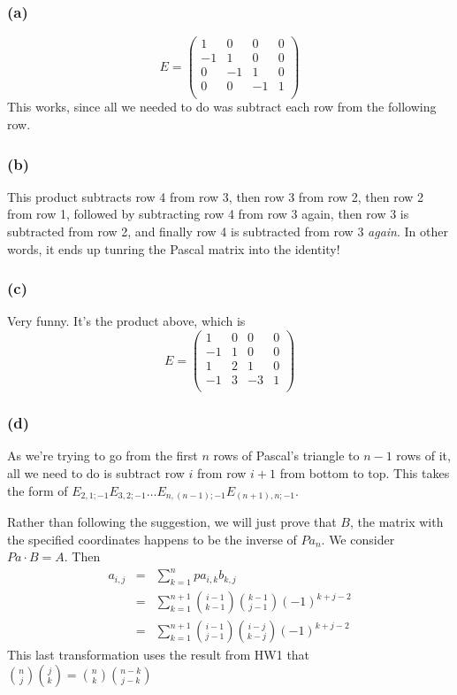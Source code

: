 \documentclass{article}
\begin{document}
\subsubsection{(a)}
\[
E=\left( 
\begin{array}{cccc}
1 &0 &0 &0\\
-1&1 &0 &0\\
0 &-1&1 &0\\
0 &0 &-1&1\\
\end{array}
\right)
\]
This works, since all we needed to do was subtract each row from the following
row.
\subsubsection{(b)}
This product subtracts row 4 from row 3, then row 3 from row 2, then row 2 from
row 1, followed by subtracting row 4 from row 3 again, then row 3 is subtracted
from row 2, and finally row 4 is subtracted from row 3 \emph{again}.
In other words, it ends up tunring the Pascal matrix into the identity!
\subsubsection{(c)}
Very funny. It's the product above, which is 
\[
E=\left( 
\begin{array}{cccc}
1 &0 &0 &0\\
-1&1 &0 &0\\
1 &2 &1 &0\\
-1&3 &-3&1\\
\end{array}
\right)
\]

\subsubsection{(d)}
As we're trying to go from the first $n$ rows of Pascal's triangle to $n-1$ rows
of it, all we need to do is subtract row $i$ from row $i+1$ from bottom to top.
This takes the form of
$E_{2,1;-1}E_{3,2;-1}\dots E_{n,(n-1); -1}E_{(n+1),n; -1}$.

\medskip
Rather than following the suggestion, we will just prove that $B$, the matrix with
the specified coordinates happens to be the inverse of $Pa_n$.
We consider $Pa\cdot B = A$. Then
\begin{eqnarray*}
  a_{i,j} &=& \sum_{k=1}^n pa_{i,k}b_{k,j}\\
  &=& \sum_{k=1}^{n+1} \binom{i-1}{k-1} \binom{k-1}{j-1}(-1)^{k + j - 2}\\
  &=& \sum_{k=1}^{n+1} \binom{i-1}{j-1}\binom{i-j}{k-j}(-1)^{k+j-2}
\end{eqnarray*}
This last transformation uses the result from HW1 that
$\binom{n}{j}\binom{j}{k} = \binom{n}{k}\binom{n-k}{j-k} $
\end{document}
